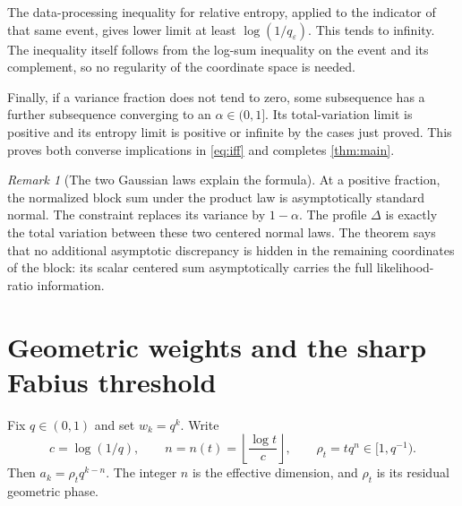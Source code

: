 \documentclass[11pt,a4paper]{article}
\numberwithin{equation}{section}
\theoremstyle{definition}
\theoremstyle{remark}
\newtheorem{remark}[remark]{Remark}
\begin{document}
The data-processing inequality for relative entropy, applied to the
indicator of that same event, gives lower limit at least
$\log(1/q_\varepsilon)$. This tends to infinity. The inequality
itself follows from the log-sum inequality on the event and its
complement, so no regularity of the coordinate space is needed.

Finally, if a variance fraction does not tend to zero, some
subsequence has a further subsequence converging to an
$\alpha\in(0,1]$. Its total-variation limit is positive and its
entropy limit is positive or infinite by the cases just proved.
This proves both converse implications in \cref{eq:iff} and
completes \cref{thm:main}.

\begin{remark}[The two Gaussian laws explain the formula]
At a positive fraction, the normalized block sum under the product
law is asymptotically standard normal. The constraint replaces its
variance by $1-\alpha$. The profile $\Delta$ is exactly the total
variation between these two centered normal laws. The theorem says
that no additional asymptotic discrepancy is hidden in the remaining
coordinates of the block: its scalar centered sum asymptotically
carries the full likelihood-ratio information.
\end{remark}

\section{Geometric weights and the sharp Fabius threshold}
\label{sec:geometric}
Fix $q\in(0,1)$ and set $w_k=q^k$. Write
\begin{equation}\label{eq:phase}
 c=\log(1/q),\qquad n=n(t)=\left\lfloor\frac{\log t}{c}\right\rfloor,
 \qquad \rho_t=tq^n\in[1,q^{-1}).
\end{equation}
Then $a_k=\rho_tq^{k-n}$. The integer $n$ is the effective dimension,
and $\rho_t$ is its residual geometric phase.
\end{document}
